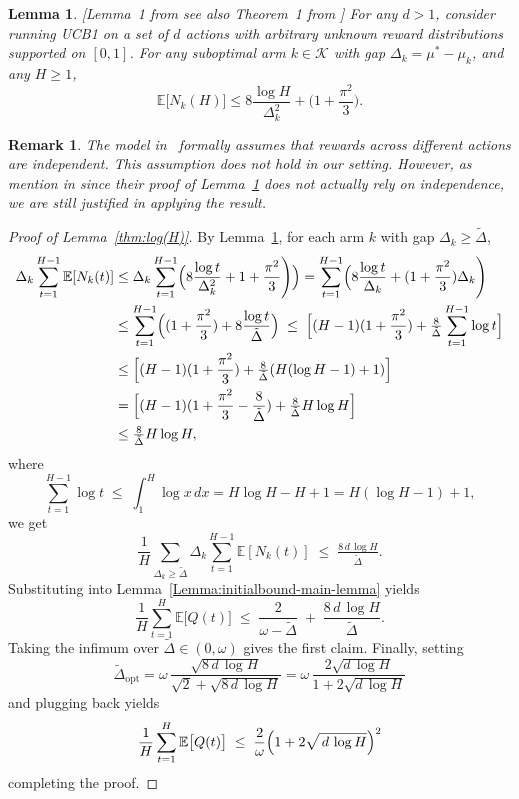 \documentclass[12pt,draftcls, onecolumn]{IEEEtran}
\newcommand{\vedisc}{\omega}
\newcommand{\EE}{\mathbb{E}}
\newtheorem{remark}{Remark}
\newtheorem{lemma}{Lemma}
\begin{document}
{\begin{lemma}
\label{lem:UCB1}[Lemma~1 from \cite{10.1007/978-3-540-72927-3_33} see also Theorem~1 from \cite{Auer2002FinitetimeAO}]
For any ${d} > 1$, consider running UCB1 on a set of ${d}$ actions with arbitrary unknown reward distributions supported on $[0,1]$.  For any suboptimal arm \(k\in\mathcal{K}\) with gap \(\Delta_k=\mu^*-\mu_k\), and any \(H\ge1\), 
\[
\EE\bigl[N_k(H)\bigr] \leq 
8  \frac{\log H}{\Delta_k^2}
+ \Bigg(1 + \frac{\pi^2}{3}\Bigg).
\]
\end{lemma}

\begin{remark}
The model in~\cite{Auer2002FinitetimeAO} formally assumes that rewards across different actions are independent. 
This assumption does not hold in our setting. 
However, as mention in \cite{Kleinberg2003} since their proof of Lemma~\ref{lem:UCB1} does not actually rely on independence, 
we are still justified in applying the result.
\end{remark}
\begin{proof}[Proof of Lemma~\ref{thm:log(H)}]
By Lemma~\ref{lem:UCB1}, for each arm \(k\) with gap \(\Delta_k\ge\tilde\Delta\),
\begin{align*}
\Delta_k\sum_{t=1}^{H-1}\EE[N_k(t)]
&\le
\Delta_k\sum_{t=1}^{H-1}\Bigl(8  \frac{\log t}{\Delta_k^2}
+ 1 + \frac{\pi^2}{3}\Bigg)\Bigr)
=
\sum_{t=1}^{H-1}\Bigl(8  \frac{\log t}{\Delta_k}
+ (1 + \frac{\pi^2}{3})\Delta_k\Bigg)\\
&\le
\sum_{t=1}^{H-1}\Bigl((1 + \frac{\pi^2}{3}) + 8\frac{\log t}{\tilde\Delta}\Bigr)
\;\le\;
\Bigl[(H-1)(1 + \frac{\pi^2}{3}) + \tfrac{8}{\tilde\Delta}\sum_{t=1}^{H-1}\log t\Bigr]\\
&\le
\Bigl[(H-1)(1 + \frac{\pi^2}{3}) + \tfrac{8}{\tilde\Delta}(H(\log H - 1) + 1)\Bigr]\\
&=
\Bigl[(H-1)(1 + \frac{\pi^2}{3} - \frac{8}{\tilde\Delta}) + \tfrac{8}{\tilde\Delta}H\log H\Bigr]\\
&\leq
\tfrac{8}{\tilde\Delta}H\log H,
\end{align*}
where
\[
\sum_{t=1}^{H-1}\log t
\;\le\;
\int_{1}^{H}\log x\,dx
=
H\log H - H + 1
=
H(\log H - 1) + 1,
\]
we get
\[
\frac{1}{H}\sum_{\Delta_k\ge\tilde\Delta}\Delta_k\sum_{t=1}^{H-1}\EE[N_k(t)]
\;\le\;
\tfrac{8\,{d}\,\log H}{\tilde\Delta}.
\]
Substituting into Lemma~\ref{Lemma:initialbound-main-lemma} yields
\[
\frac{1}{H}\sum_{t=1}^H\EE\bigl[Q(t)\bigr]
\;\le\;
\frac{2}{\vedisc-\tilde\Delta}
\;+\;
\frac{8\,{d}\,\log H}{\tilde\Delta}.
\]
Taking the infimum over \(\tilde\Delta\in(0,\vedisc)\) gives the first claim.  Finally, setting
\[
\tilde\Delta_{\mathrm{opt}}
=
\vedisc\,
\frac{\sqrt{8\,{d}\,\log H}}{\sqrt{2} + \sqrt{8\,{d}\,\log H}}
=
\vedisc\,
\frac{2\sqrt{{d}\,\log H}}{1 + 2\sqrt{{d}\,\log H}}
\]
and plugging back yields
\[
\frac{1}{H}\sum_{t=1}^H\EE\bigl[Q(t)\bigr]
\;\le\;
\frac{2}{\vedisc}\Bigl(1+2\sqrt{\,{d}\,\log H}\Bigr)^2
\]
completing the proof.


\end{proof}}
\end{document}
